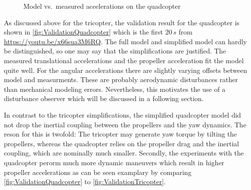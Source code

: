 \begin{figure}[p]
 \centering
 \footnotesize%
 
 \vspace{-20pt}
 \caption{Model vs.\ measured accelerations on the quadcopter}
 \label{fig:ValidationQuadcopter}
\end{figure}

As discussed above for the tricopter, the validation result for the quadcopter is shown in \autoref{fig:ValidationQuadcopter} which is the first $20\,\unit{s}$ from \url{https://youtu.be/x66sua3M6RQ}.
The full model and simplified model can hardly be distinguished, so one may say that the simplifications are justified.
The measured translational accelerations and the propeller acceleration fit the model quite well.
For the angular accelerations there are slightly varying offsets between model and measurments.
These are probably aerodynamic disturbances rather than mechanical modeling errors.
Nevertheless, this motivates the use of a disturbance observer which will be discussed in a following section.

In contrast to the tricopter simplifications, the simplified quadcopter model did not drop the inertial coupling between the propellers and the yaw dynamics.
The reson for this is twofold:
The tricopter may generate yaw torque by tilting the propellers, whereas the quadcopter relies on the propeller drag and the inertial coupling, which are nominally much smaller.
Secondly, the experiments with the quadcopter perorm much more dynamic maneuvers which result in higher propeller accelerations as can be seen examplary by comparing \autoref{fig:ValidationQuadcopter} to \autoref{fig:ValidationTricopter}.
